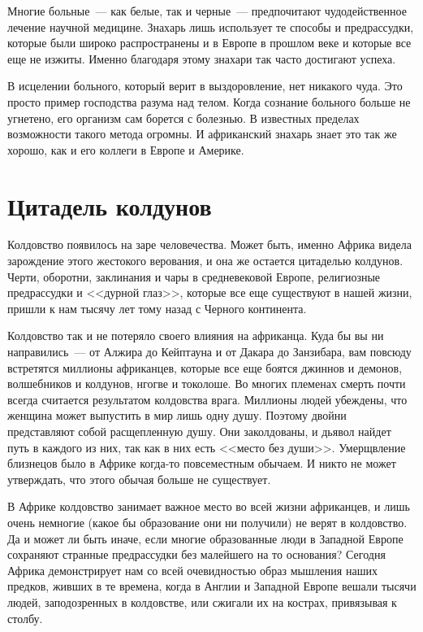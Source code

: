 \documentclass[12pt,a4paper,twoside,openany,svgnames]{memoir}
\begin{document}
Многие больные~--- как белые, так и черные~--- предпочитают чудодейственное лечение научной медицине. Знахарь лишь использует те способы и предрассудки, которые были широко распространены и в Европе в прошлом веке и которые все еще не изжиты. Именно благодаря этому знахари так часто достигают успеха.

В исцелении больного, который верит в выздоровление, нет никакого чуда. Это просто пример господства разума над телом. Когда сознание больного больше не угнетено, его организм сам борется с болезнью. В известных пределах возможности такого метода огромны. И африканский знахарь знает это так же хорошо, как и его коллеги в Европе и Америке.

\chapter{Цитадель колдунов}

Колдовство появилось на заре человечества. Может быть, именно Африка видела зарождение этого жестокого верования, и она же остается цитаделью колдунов. Черти, оборотни, заклинания и чары в средневековой Европе, религиозные предрассудки и <<дурной глаз>>, которые все еще существуют в нашей жизни, пришли к нам тысячу лет тому назад с Черного континента.

Колдовство так и не потеряло своего влияния на африканца. Куда бы вы ни направились~--- от Алжира до Кейптауна и от Дакара до Занзибара, вам повсюду встретятся миллионы африканцев, которые все еще боятся джиннов и демонов, волшебников и колдунов, нгогве и токолоше. Во многих племенах смерть почти всегда считается результатом колдовства врага. Миллионы людей убеждены, что женщина может выпустить в мир лишь одну душу. Поэтому двойни представляют собой расщепленную душу. Они заколдованы, и дьявол найдет путь в каждого из них, так как в них есть <<место без души>>. Умерщвление близнецов было в Африке когда-то повсеместным обычаем. И никто не может утверждать, что этого обычая больше не существует.

В Африке колдовство занимает важное место во всей жизни африканцев, и лишь очень немногие (какое бы образование они ни получили) не верят в колдовство. Да и может ли быть иначе, если многие образованные люди в Западной Европе сохраняют странные предрассудки без малейшего на то основания? Сегодня Африка демонстрирует нам со всей очевидностью образ мышления наших предков, живших в те времена, когда в Англии и Западной Европе вешали тысячи людей, заподозренных в колдовстве, или сжигали их на кострах, привязывая к столбу.
\end{document}
